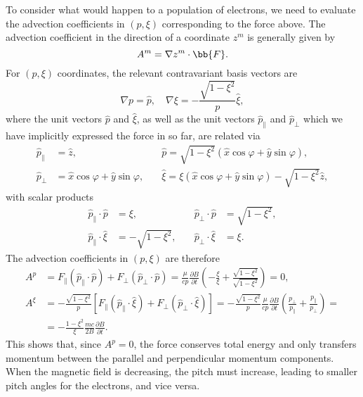 \documentclass{notes}
\newcommand{\ppar}{p_\parallel}
\newcommand{\pperp}{p_\perp}
\begin{document}
	To consider what would happen to a population of electrons, we need to
	evaluate the advection coefficients in $(p,\xi)$ corresponding to the force
	above. The advection coefficient in the direction of a coordinate $z^m$ is
	generally given by
	\begin{equation}
		A^m = \nabla z^m\cdot\bb{F}.
	\end{equation}
	For $(p,\xi)$ coordinates, the relevant contravariant basis vectors are
	\begin{equation}
		\nabla p = \hat{p},\quad \nabla\xi = -\frac{\sqrt{1-\xi^2}}{p}\hat{\xi},
	\end{equation}
	where the unit vectors $\hat{p}$ and $\hat{\xi}$, as well as the unit
	vectors $\hat{p}_\parallel$ and $\hat{p}_\perp$ which we have implicitly
	expressed the force in so far, are related via
	\begin{equation}
		\begin{aligned}
			\hat{p}_\parallel &= \hat{z}, \quad &\hat{p} = \sqrt{1-\xi^2}\left(\hat{x}\cos\varphi + \hat{y}\sin\varphi\right),\\
			\hat{p}_\perp &= \hat{x}\cos\varphi + \hat{y}\sin\varphi, \quad &\hat{\xi} = \xi\left(\hat{x}\cos\varphi + \hat{y}\sin\varphi\right) - \sqrt{1-\xi^2}\hat{z},
		\end{aligned}
	\end{equation}
	with scalar products
	\begin{equation}
		\begin{aligned}
			\hat{p}_\parallel\cdot\hat{p} &= \xi, \quad
			&\hat{p}_\perp\cdot\hat{p} &= \sqrt{1-\xi^2},\\
			\hat{p}_\parallel\cdot\hat{\xi} &= -\sqrt{1-\xi^2},\quad
			&\hat{p}_\perp\cdot\hat{\xi} &= \xi.
		\end{aligned}
	\end{equation}
	The advection coefficients in $(p,\xi)$ are therefore
	\begin{equation}\label{eq:Fmu}
		\begin{aligned}
			A^p &= F_\parallel\left(\hat{p}_\parallel\cdot\hat{p}\right) + F_\perp\left(\hat{p}_\perp\cdot\hat{p}\right) =
			\frac{\mu}{cp}\frac{\partial B}{\partial t}\left(-\frac{\xi}{\xi} + \frac{\sqrt{1-\xi^2}}{\sqrt{1-\xi^2}}\right) = 0,\\
			A^\xi &= -\frac{\sqrt{1-\xi^2}}{p}\left[F_\parallel\left(\hat{p}_\parallel\cdot\hat{\xi}\right) + F_\perp\left(\hat{p}_\perp\cdot\hat{\xi}\right)\right] =
			-\frac{\sqrt{1-\xi^2}}{p}\frac{\mu}{cp}\frac{\partial B}{\partial t}\left(\frac{\pperp}{\ppar} + \frac{\ppar}{\pperp}\right) =\\
			&= -\frac{1-\xi^2}{\xi}\frac{mc}{2B}\frac{\partial B}{\partial t}.
		\end{aligned}
	\end{equation}
	This shows that, since $A^p=0$, the force conserves total energy and only
	transfers momentum between the parallel and perpendicular momentum
	components. When the magnetic field is decreasing, the pitch must increase,
	leading to smaller pitch angles for the electrons, and vice versa.
\end{document}
